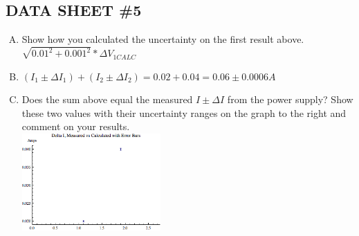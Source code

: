 \subsection{DATA SHEET \#5}
	\begin{enumerate}[A.]
		\item Show how you calculated the uncertainty on the first result above.\\ 
		
		$\sqrt{0.01^2 + 0.001^2} * \Delta V_{1CALC}$\\
		
		\item $(I_1 \pm \Delta I_1) + (I_2 \pm \Delta I_2) = 0.02 + 0.04 = 0.06 \pm 0.0006 A$ \\
		
		\item Does the sum above equal the measured $I \pm \Delta I$ from the power supply?  Show these two values with their uncertainty ranges on the graph to the right and comment on your results. \\ 
		\includegraphics[width=200px]{lab6_graph3_cur2errorbars}
		
	\end{enumerate}